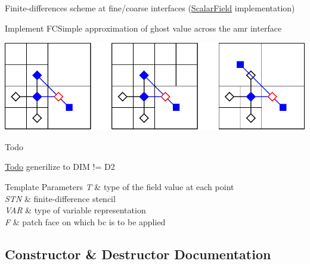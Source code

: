 Finite-\/differences scheme at fine/coarse interfaces (\hyperlink{structUintah_1_1PhaseField_1_1ScalarField}{Scalar\+Field} implementation) 

Implement F\+C\+Simple approximation of ghost value across the amr interface


\begin{DoxyImage}
\includegraphics[width=\textwidth,height=\textheight/2,keepaspectratio=true]{fcsimple}
\end{DoxyImage}
 \begin{DoxyRefDesc}{Todo}
\item[\hyperlink{todo__todo000009}{Todo}]generilize to D\+IM != D2\end{DoxyRefDesc}



\begin{DoxyTemplParams}{Template Parameters}
{\em T} & type of the field value at each point \\
\hline
{\em S\+TN} & finite-\/difference stencil \\
\hline
{\em V\+AR} & type of variable representation \\
\hline
{\em F} & patch face on which bc is to be applied \\
\hline
\end{DoxyTemplParams}


\subsection{Constructor \& Destructor Documentation}
\mbox{\label{classUintah_1_1PhaseField_1_1detail_1_1bc__fd_3_01ScalarField_3_01T_01_4_00_01STN_00_01VAR_00_01ce55d0bf8381798bc129da931b626e80_a4ff2e7573d5e22d6e6d044016f22937e}} 
